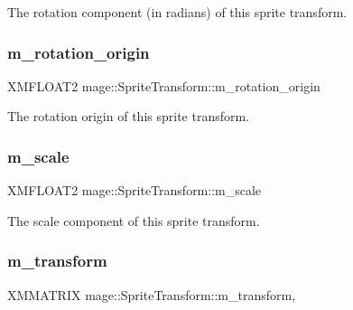 The rotation component (in radians) of this sprite transform. \hypertarget{structmage_1_1_sprite_transform_ae51ebd0226ef4b569b6a66884823bd18}{}\label{structmage_1_1_sprite_transform_ae51ebd0226ef4b569b6a66884823bd18} 
\subsubsection{\texorpdfstring{m\+\_\+rotation\+\_\+origin}{m\_rotation\_origin}}
{\footnotesize\ttfamily X\+M\+F\+L\+O\+A\+T2 mage\+::\+Sprite\+Transform\+::m\+\_\+rotation\+\_\+origin\hspace{0.3cm}{\ttfamily [private]}}

The rotation origin of this sprite transform. \hypertarget{structmage_1_1_sprite_transform_a7532d4d41d02b5fa6f31eeb4fd4fd886}{}\label{structmage_1_1_sprite_transform_a7532d4d41d02b5fa6f31eeb4fd4fd886} 
\subsubsection{\texorpdfstring{m\+\_\+scale}{m\_scale}}
{\footnotesize\ttfamily X\+M\+F\+L\+O\+A\+T2 mage\+::\+Sprite\+Transform\+::m\+\_\+scale\hspace{0.3cm}{\ttfamily [private]}}

The scale component of this sprite transform. \hypertarget{structmage_1_1_sprite_transform_ad2fec50a82772514da9399ff31703f3d}{}\label{structmage_1_1_sprite_transform_ad2fec50a82772514da9399ff31703f3d} 
\subsubsection{\texorpdfstring{m\+\_\+transform}{m\_transform}}
{\footnotesize\ttfamily X\+M\+M\+A\+T\+R\+IX mage\+::\+Sprite\+Transform\+::m\+\_\+transform\hspace{0.3cm}{\ttfamily [mutable]}, {\ttfamily [private]}}

